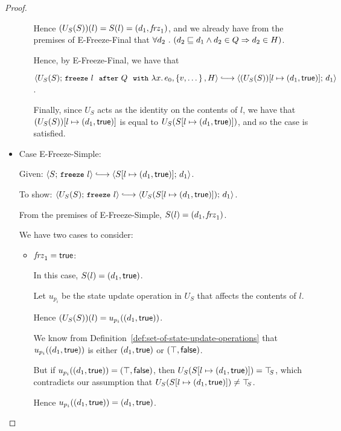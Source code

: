 \begin{proof}
\begin{itemize}
\begin{itemize}
      Hence $(U_S(S))(l) = S(l) = (d_1, \mathit{frz}_1)$, and we
      already have from the premises of {\sc E-Freeze-Final} that
      $\forall{d_2} ~.~ ( {d_2 \sqsubseteq d_1 \land d_2 \in Q}
      \Rightarrow d_2 \in H)$.

      Hence, by {\sc E-Freeze-Final}, we have that

      $\config{U_S(S)}{\freezeafterfull{l}{Q}{\lam{x}{e_0}}{\setof{v,
            \dots}}{H}} \parstepsto
      \config{\extS{(U_S(S))}{l}{d_1}{\frozentrue}}{d_1}$.

      Finally, since $U_S$ acts as the identity on the contents of
      $l$, we have that $(U_S(S))[l \mapsto (d_1, \textsf{true})]$ is
      equal to $U_S(S[l \mapsto (d_1, \textsf{true})])$, and so the case
      is satisfied.
    \end{itemize}

  \item Case {\sc E-Freeze-Simple}:

    Given: $\config{S}{\freeze{l}} \parstepsto
    \config{\extS{S}{l}{d_1}{\frozentrue}}{d_1}$.

    To show: $\config{U_S(S)}{\freeze{l}} \parstepsto
    \config{U_S(\extS{S}{l}{d_1}{\frozentrue})}{d_1}$.

    From the premises of {\sc E-Freeze-Simple}, $S(l) =
    (d_1, \mathit{frz}_1)$.

    We have two cases to consider:
    \begin{itemize}
    \item $\mathit{frz}_1 = \textsf{true}$:

      In this case, $S(l) = (d_1, \textsf{true})$.

      Let $u_{p_i}$ be the state update operation in $U_S$ that
      affects the contents of $l$.

      Hence $(U_S(S))(l) = u_{p_i}((d_1, \textsf{true}))$.

      We know from Definition~\ref{def:set-of-state-update-operations}
      that $u_{p_i}((d_1, \textsf{true}))$ is either
      $(d_1, \textsf{true})$ or $(\top, \textsf{false})$.

      But if $u_{p_i}((d_1, \textsf{true})) =
      (\top, \textsf{false})$, then
      $U_S(S[l \mapsto (d_1, \textsf{true})]) = \top\hspace{-0.85mm}_{S}$, which contradicts
      our assumption that $U_S(S[l \mapsto (d_1, \textsf{true})]) \neq
      \top\hspace{-0.85mm}_{S}$.

      Hence $u_{p_i}((d_1, \textsf{true})) =
      (d_1, \textsf{true})$.


\end{itemize}
\end{itemize}
\end{proof}
